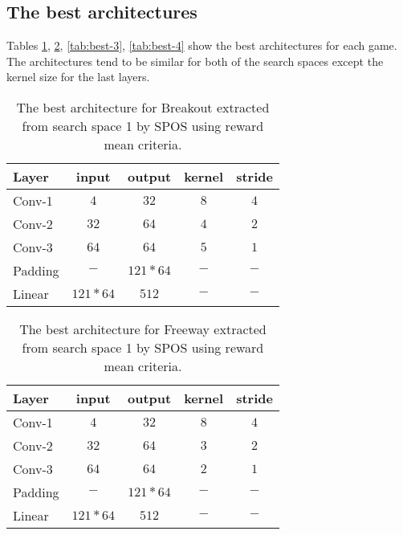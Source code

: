 \documentclass{svproc}
\begin{document}
\begin{appendix}
\section{The best architectures}
\label{app:found-architectures}
Tables \ref{tab:best-1}, \ref{tab:best-2}, \ref{tab:best-3}, \ref{tab:best-4} show the best architectures for each game.  The architectures tend to be similar for both of the search spaces except the kernel size for the last layers.
\begin{table}[!h]
\begin{center}
\begin{tabularx}{0.5\textwidth}{@{}lcccc@{}}
    \hline
    \textbf{Layer} & \textbf{input} & \textbf{output} & \textbf{kernel} & \textbf{stride}\\
    \hline
        Conv-1 & $4$ & $32$ & $8$ & $4$         \\
        Conv-2 & $32$ & $64$ & $4$ & $2$        \\
        Conv-3 & $64$ & $64$ & $5$ & $1$        \\
        Padding & $-$ & $121*64$ & $-$ & $-$    \\        
        Linear & $121*64$ & $512$ & $-$ & $-$   \\
    \hline
\end{tabularx}
\caption{The best architecture for Breakout extracted from search space 1 by SPOS using reward mean criteria.}\label{tab:best-1}
\end{center}
\end{table}

\begin{table}[!h]
\begin{center}
\begin{tabularx}{0.5\textwidth}{@{}lcccc@{}}
    \hline
    \textbf{Layer} & \textbf{input} & \textbf{output} & \textbf{kernel} & \textbf{stride}\\
    \hline
        Conv-1 & $4$ & $32$ & $8$ & $4$         \\
        Conv-2 & $32$ & $64$ & $3$ & $2$        \\
        Conv-3 & $64$ & $64$ & $2$ & $1$        \\
        Padding & $-$ & $121*64$ & $-$ & $-$    \\        
        Linear & $121*64$ & $512$ & $-$ & $-$   \\
    \hline
\end{tabularx}
\caption{The best architecture for Freeway extracted from search space 1 by SPOS using reward mean criteria.}\label{tab:best-2}
\end{center}
\end{table}


\end{appendix}
\end{document}
